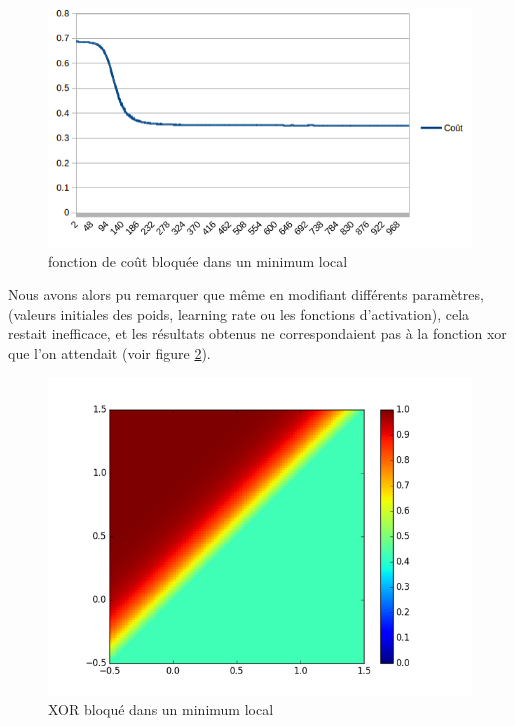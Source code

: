 \begin{figure}[!h]
\begin{center}
\includegraphics[scale=0.6]{images/xor_cost_function.png}
\caption{fonction de coût bloquée dans un minimum local}
\label{xor_cout_bloque}
\end{center}
\end{figure}

Nous avons alors pu remarquer que même en modifiant différents paramètres, (valeurs initiales des poids, learning rate ou les fonctions d'activation), cela restait inefficace, et les résultats obtenus ne correspondaient pas à la fonction xor que l'on attendait (voir figure \ref{xor_non_fonctionnel}).

\begin{figure}[!h]
\begin{center}
\includegraphics[scale=0.6]{images/xor_non_fonctionnel.png}
\caption{XOR bloqué dans un minimum local}
\label{xor_non_fonctionnel}
\end{center}
\end{figure}

